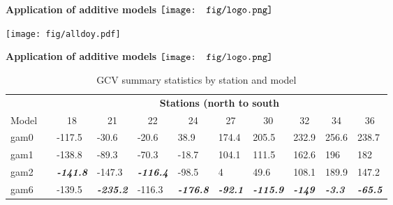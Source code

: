 \documentclass{beamer}
\newcommand{\emtxt}[1]{\textbf{\textit{{\color{mypal4} #1}}}}
\begin{document}
\begin{frame}{\textbf{Application of additive models} \hspace{0pt plus 1 filll} $\vcenter{\hbox{\texttt{[image: fig/logo.png]}}}$}
\vspace{-0.2in}
\begin{center}
\texttt{[image: fig/alldoy.pdf]}
\end{center}
\end{frame}

\begin{frame}{\textbf{Application of additive models} \hspace{0pt plus 1 filll} $\vcenter{\hbox{\texttt{[image: fig/logo.png]}}}$}

\begin{table}[!tbp]
{\tiny
\caption{GCV summary statistics by station and model\label{totab}} 
\begin{center}
\begin{tabular}{lclllllllll}
\hline\hline
\multicolumn{1}{c}{\bfseries }&\multicolumn{1}{c}{\bfseries }&\multicolumn{9}{c}{\bfseries Stations (north to south}\tabularnewline
\cline{3-11}
\multicolumn{1}{c}{Model}&\multicolumn{1}{c}{}&\multicolumn{1}{c}{18}&\multicolumn{1}{c}{21}&\multicolumn{1}{c}{22}&\multicolumn{1}{c}{24}&\multicolumn{1}{c}{27}&\multicolumn{1}{c}{30}&\multicolumn{1}{c}{32}&\multicolumn{1}{c}{34}&\multicolumn{1}{c}{36}\tabularnewline
\hline
gam0&&-117.5&-30.6&-20.6&38.9&174.4&205.5&232.9&256.6&238.7\tabularnewline
gam1&&-138.8&-89.3&-70.3&-18.7&104.1&111.5&162.6&196&182\tabularnewline
gam2&&{\tiny \emtxt{-141.8}}&-147.3&{\tiny \emtxt{-116.4}}&-98.5&4&49.6&108.1&189.9&147.2\tabularnewline
gam6&&-139.5&{\tiny \emtxt{-235.2}}&-116.3&{\tiny \emtxt{-176.8}}&{\tiny \emtxt{-92.1}}&{\tiny \emtxt{-115.9}}&{\tiny \emtxt{-149}}&{\tiny \emtxt{-3.3}}&{\tiny \emtxt{-65.5}}\tabularnewline
\hline
\end{tabular}\end{center}}
\end{table}
\begin{table}[!tbp]

\end{table}
\end{frame}
\end{document}
